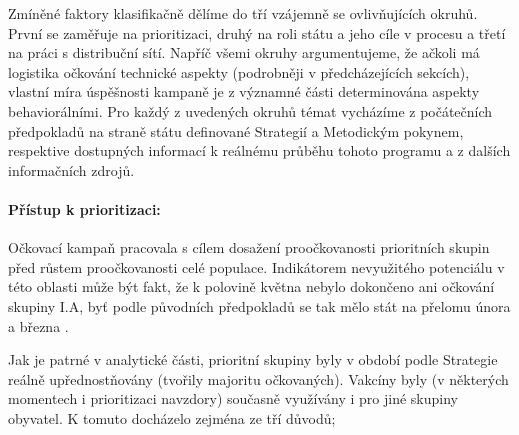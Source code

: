 Zmíněné faktory klasifikačně dělíme do tří vzájemně se ovlivňujících okruhů. První se zaměřuje na prioritizaci, druhý na roli státu a jeho cíle v procesu a třetí na práci s distribuční sítí. %
%
Napříč všemi okruhy argumentujeme, že ačkoli má logistika očkování technické aspekty (podrobněji v předcházejících sekcích), vlastní míra úspěšnosti kampaně je z významné části determinována aspekty behaviorálními. Pro každý z uvedených okruhů témat vycházíme z počátečních předpokladů na straně státu definované Strategií a Metodickým pokynem, respektive dostupných informací k reálnému průběhu tohoto programu a z dalších informačních zdrojů.


\paragraph{Přístup k prioritizaci:} Očkovací kampaň pracovala s cílem dosažení proočkovanosti prioritních skupin před růstem proočkovanosti celé populace. Indikátorem nevyužitého potenciálu v této oblasti může být fakt, že k polovině května nebylo dokončeno ani očkování skupiny I.A, byť podle původních předpokladů se tak mělo stát na přelomu února a března \cite{ockovani_mp}.



Jak je patrné v analytické části, prioritní skupiny byly v období podle Strategie reálně upřednostňovány (tvořily majoritu očkovaných). Vakcíny byly (v některých momentech i prioritizaci navzdory) současně využívány i pro jiné skupiny obyvatel. K tomuto docházelo zejména ze tří důvodů;
%


